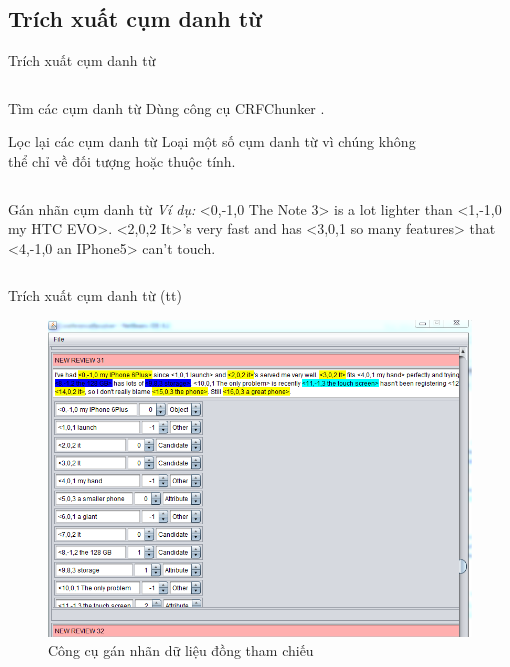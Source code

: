 \documentclass[9pt,xcolor=table,hyperref=unicode]{beamer}
\begin{document}
	\subsection{Trích xuất cụm danh từ}
	\begin{frame}{Trích xuất cụm danh từ}		
		\begin{columns}[t]
			\begin{column}{0.4\textwidth}
			   	\begin{block}{Tìm các cụm danh từ}
	   				Dùng công cụ CRFChunker \footnotemark.
				\end{block}
				\begin{block}{Lọc lại các cụm danh từ}
			   		Loại một số cụm danh từ vì chúng không thể chỉ về đối tượng hoặc thuộc tính.				
				\end{block}
			\end{column}
			\begin{column}{0.6\textwidth}  %
			 	\begin{figure}[H]
					\LARGE 
					\centering				
					\resizebox{65mm}{!}{}	
				\end{figure}
			\end{column}
		\end{columns}
		\begin{columns}[t]
			\begin{column}{\textwidth}
			   	\begin{block}{Gán nhãn cụm danh từ}					
					\textit{Ví dụ:} <0,-1,0 The Note 3> is a lot lighter than <1,-1,0 my HTC EVO>. <2,0,2 It>'s very fast and has <3,0,1 so many features> that <4,-1,0 an IPhone5> can't touch. 
				\end{block}					
			\end{column}			
		\end{columns}
	\end{frame}

	\begin{frame}{Trích xuất cụm danh từ (tt)}
		\begin{figure}[H]
			\centering							
			\includegraphics[scale=0.45]{images/markup_tool}				
			\caption{Công cụ gán nhãn dữ liệu đồng tham chiếu}				
		\end{figure}
	\end{frame}
\end{document}
